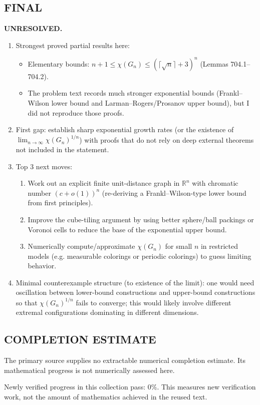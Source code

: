 \subsection*{FINAL}
\textbf{UNRESOLVED.}
\begin{enumerate}
\item[(i)] Strongest proved partial results here:
  \begin{itemize}
  \item Elementary bounds: $n+1\le \chi(G_n)\le (\lceil\sqrt{n}\rceil+3)^n$ (Lemmas 704.1--704.2).
  \item The problem text records much stronger exponential bounds (Frankl--Wilson lower bound and Larman--Rogers/Prosanov upper bound), but I did not reproduce those proofs.
  \end{itemize}
\item[(ii)] First gap: establish sharp exponential growth rates (or the existence of $\lim_{n\to\infty}\chi(G_n)^{1/n}$) with proofs that do not rely on deep external theorems not included in the statement.
\item[(iii)] Top 3 next moves:
  \begin{enumerate}
  \item Work out an explicit finite unit-distance graph in $\mathbb{R}^n$ with chromatic number $(c+o(1))^n$ (re-deriving a Frankl--Wilson-type lower bound from first principles).
  \item Improve the cube-tiling argument by using better sphere/ball packings or Voronoi cells to reduce the base of the exponential upper bound.
  \item Numerically compute/approximate $\chi(G_n)$ for small $n$ in restricted models (e.g. measurable colorings or periodic colorings) to guess limiting behavior.
  \end{enumerate}
\item[(iv)] Minimal counterexample structure (to existence of the limit): one would need oscillation between lower-bound constructions and upper-bound constructions so that $\chi(G_n)^{1/n}$ fails to converge; this would likely involve different extremal configurations dominating in different dimensions.
\end{enumerate}



\subsection*{COMPLETION ESTIMATE}
The primary source supplies no extractable numerical completion estimate. Its mathematical progress is not numerically assessed here.

Newly verified progress in this collection pass: $0\%$. This measures new verification work, not the amount of mathematics achieved in the reused text.
